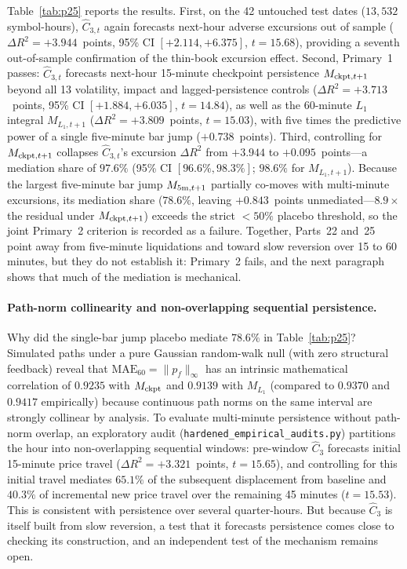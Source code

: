 \documentclass[12pt]{article}
\theoremstyle{definition}
\theoremstyle{remark}
\begin{document}
Table~\ref{tab:p25} reports the results. First, on the 42 untouched test dates ($13{,}532$ symbol-hours), $\hat C_{3,t}$ again forecasts next-hour adverse excursions out of sample ($\Delta R^2=+3.944$~points, 95\% CI $[+2.114,+6.375]$, $t=15.68$), providing a seventh out-of-sample confirmation of the thin-book excursion effect. Second, Primary~1 passes: $\hat C_{3,t}$ forecasts next-hour 15-minute checkpoint persistence $M_{{\rm ckpt},t+1}$ beyond all 13 volatility, impact and lagged-persistence controls ($\Delta R^2=+3.713$~points, 95\% CI $[+1.884,+6.035]$, $t=14.84$), as well as the 60-minute $L_1$ integral $M_{L_1,t+1}$ ($\Delta R^2=+3.809$~points, $t=15.03$), with five times the predictive power of a single five-minute bar jump ($+0.738$~points). Third, controlling for $M_{{\rm ckpt},t+1}$ collapses $\hat C_{3,t}$'s excursion $\Delta R^2$ from $+3.944$ to $+0.095$~points---a mediation share of $97.6\%$ (95\% CI $[96.6\%,98.3\%]$; $98.6\%$ for $M_{L_1,t+1}$). Because the largest five-minute bar jump $M_{5{\rm m},t+1}$ partially co-moves with multi-minute excursions, its mediation share ($78.6\%$, leaving $+0.843$~points unmediated---$8.9\times$ the residual under $M_{{\rm ckpt},t+1}$) exceeds the strict $<50\%$ placebo threshold, so the joint Primary~2 criterion is recorded as a failure. Together, Parts~22 and~25 point away from five-minute liquidations and toward slow reversion over 15 to 60 minutes, but they do not establish it: Primary~2 fails, and the next paragraph shows that much of the mediation is mechanical.

\paragraph{Path-norm collinearity and non-overlapping sequential persistence.} Why did the single-bar jump placebo mediate $78.6\%$ in Table~\ref{tab:p25}? Simulated paths under a pure Gaussian random-walk null (with zero structural feedback) reveal that $\mathrm{MAE}_{60}=\|p_f\|_\infty$ has an intrinsic mathematical correlation of $0.9235$ with $M_{\rm ckpt}$ and $0.9139$ with $M_{L_1}$ (compared to $0.9370$ and $0.9417$ empirically) because continuous path norms on the same interval are strongly collinear by analysis. To evaluate multi-minute persistence without path-norm overlap, an exploratory audit (\texttt{hardened\_empirical\_audits.py}) partitions the hour into non-overlapping sequential windows: pre-window $\hat C_3$ forecasts initial 15-minute price travel ($\Delta R^2=+3.321$~points, $t=15.65$), and controlling for this initial travel mediates $65.1\%$ of the subsequent displacement from baseline and $40.3\%$ of incremental new price travel over the remaining 45 minutes ($t=15.53$). This is consistent with persistence over several quarter-hours. But because $\hat C_3$ is itself built from slow reversion, a test that it forecasts persistence comes close to checking its construction, and an independent test of the mechanism remains open.
\end{document}
